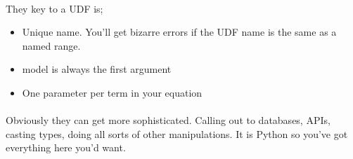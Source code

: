 \documentclass[12pt,a4paper,twoside,openright,titlepage]{article}
\begin{document}
\paragraph{} They key to a UDF is;
\begin{itemize}
	\item Unique name. You'll get bizarre errors if the UDF name is the same as a named range.
	\item model is always the first argument
	\item One parameter per term in your equation
\end{itemize}

\paragraph{} Obviously they can get more sophisticated. Calling out to databases, APIs, casting types, doing all sorts of other manipulations. It is Python so you've got everything here you'd want.

\newpage 
\printindex
\end{document}
